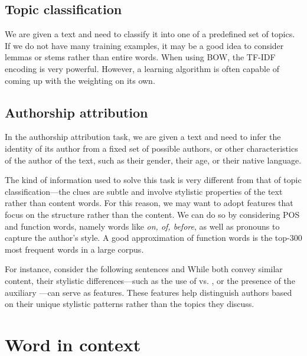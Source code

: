 \subsection{Topic classification}
We are given a text and need to classify it into one of a predefined set of topics. If we do not have many training examples, it may be a good idea to consider lemmas or stems rather than entire words. When using BOW, the TF-IDF encoding is very powerful. However, a learning algorithm is often capable of coming up with the weighting on its own.

\subsection{Authorship attribution}
In the authorship attribution task, we are given a text and need to infer the identity of its author from a fixed set of possible authors, or other characteristics of the author of the text, such as their gender, their age, or their native language.

The kind of information used to solve this task is very different from that of topic classification---the clues are subtle and involve stylistic properties of the text rather than content words. For this reason, we may want to adopt features that focus on the structure rather than the content. We can do so by considering POS and function words, namely words like \textit{on, of, before}, as well as pronouns to capture the author's style. A good approximation of function words is the top-300 most frequent words in a large corpus.

\begin{example}{}
For instance, consider the following sentences  and 
While both convey similar content, their stylistic differences—such as the use of  vs. , or the presence of the auxiliary —can serve as features. 
These features help distinguish authors based on their unique stylistic patterns rather than the topics they discuss.
\end{example}

\section{Word in context}


